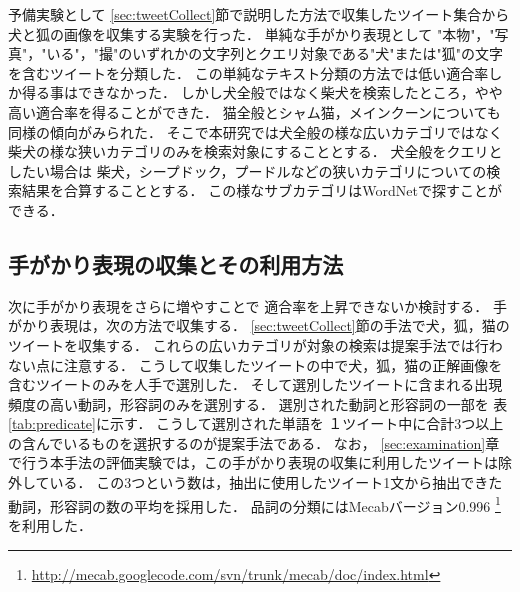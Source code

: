 予備実験として
\ref{sec:tweetCollect}節で説明した方法で収集したツイート集合から
犬と狐の画像を収集する実験を行った．
単純な手がかり表現として
"本物"，"写真"，"いる"，"撮"のいずれかの文字列とクエリ対象である"犬"または"狐"の文字を含むツイートを分類した．
この単純なテキスト分類の方法では低い適合率しか得る事はできなかった．
しかし犬全般ではなく柴犬を検索したところ，やや高い適合率を得ることができた．
猫全般とシャム猫，メインクーンについても同様の傾向がみられた．
そこで本研究では犬全般の様な広いカテゴリではなく柴犬の様な狭いカテゴリのみを検索対象にすることとする．
犬全般をクエリとしたい場合は
柴犬，シープドック，プードルなどの狭いカテゴリについての検索結果を合算することとする．
この様なサブカテゴリはWordNetで探すことができる．








\subsection{手がかり表現の収集とその利用方法}

次に手がかり表現をさらに増やすことで
適合率を上昇できないか検討する．
手がかり表現は，次の方法で収集する．
%
\ref{sec:tweetCollect}節の手法で犬，狐，猫のツイートを収集する．
これらの広いカテゴリが対象の検索は提案手法では行わない点に注意する．
こうして収集したツイートの中で犬，狐，猫の正解画像を含むツイートのみを人手で選別した．
そして選別したツイートに含まれる出現頻度の高い動詞，形容詞のみを選別する．
選別された動詞と形容詞の一部を
表\ref{tab:predicate}に示す．
こうして選別された単語を
１ツイート中に合計3つ以上の含んでいるものを選択するのが提案手法である．
なお，
\ref{sec:examination}章で行う本手法の評価実験では，この手がかり表現の収集に利用したツイートは除外している．
この3つという数は，抽出に使用したツイート1文から抽出できた動詞，形容詞の数の平均を採用した．
品詞の分類にはMecabバージョン0.996
\footnote{\url{http://mecab.googlecode.com/svn/trunk/mecab/doc/index.html}}
を利用した．



